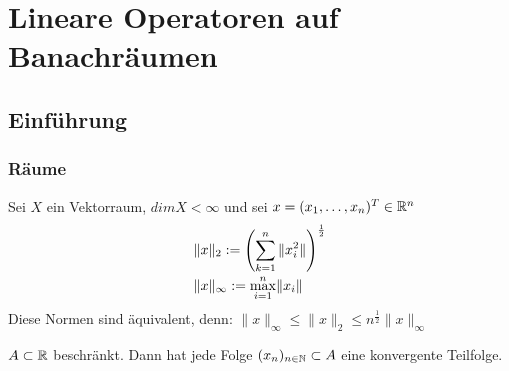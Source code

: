 
\chapter{Lineare Operatoren auf Banachräumen}
\section{Einführung}
\subsection{Räume}

Sei $X$ ein Vektorraum, $dim X < \infty $ und sei $x = (x_{1},\dotsc,x_{n})^{T} \in \mathbb{R}^{n}$
\begin{align*}
	& \|x\|_{2} := \left(\sum_{k = 1}^{n} \|x_{i}^{2}\| \right)^{\frac{1}{2}}\\
	& \|x\|_{\infty} := \smash{\displaystyle\max_{i = 1}^{n}}  \|x_{i}\|		
\end{align*}

Diese Normen sind äquivalent, denn:
$\| x \|_{\infty} \leq \| x \|_{2} \leq n^{\frac{1}{2}} \| x \|_{\infty}$ \newline

\begin{satz*} \label{s:1-bolzanoweierstrass}
$A \subset \mathbb{R}$ beschränkt. Dann hat jede Folge $(x_{n})_{n \in \mathbb{N}} \subset A$ eine konvergente Teilfolge.
\end{satz*}

